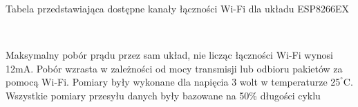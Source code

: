 \documentclass[12pt,a4paper,oneside]{memoir}
\begin{document}
\begin{table} [!h]
\centering
{}
	{\tytulyrozdzialow \footnotesize \caption[ESP8266EX - kanały Wi-Fi]{Tabela przedstawiająca dostępne kanały łączności Wi-Fi dla układu ESP8266EX}
	\caption*{\textit{Źródło: \cite{esp8266datasheet}}}}
\end{table}\\
\newpage
\par Maksymalny pobór prądu przez sam układ, nie licząc łączności Wi-Fi wynosi 12mA.
Pobór wzrasta w zależności od mocy transmisji lub odbioru pakietów za pomocą Wi-Fi. Pomiary były wykonane dla napięcia 3 wolt w temperaturze 25$^°$C. Wszystkie pomiary przesyłu danych były bazowane na 50\% długości cyklu
\end{document}
